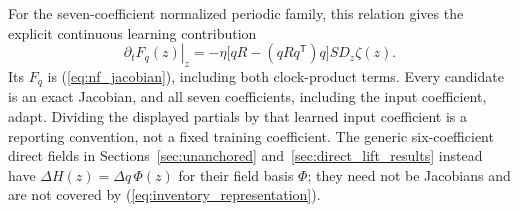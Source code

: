 \documentclass[journal]{IEEEtran}
\begin{document}
For the seven-coefficient normalized periodic family, this relation gives
the explicit continuous learning contribution
\begin{equation}
 \left.\partial_t F_q(z)\right|_z
 =-\eta\bigl[qR-(qRq^{\mathsf T})q\bigr]S D_z\zeta(z).
 \label{eq:inventory_normalized_partials}
\end{equation}
Its $F_q$ is (\ref{eq:nf_jacobian}), including both clock-product terms.
Every candidate is an exact Jacobian, and all seven coefficients, including
the input coefficient, adapt. Dividing the displayed partials by that
learned input coefficient is a reporting convention, not a fixed training
coefficient. The generic six-coefficient direct fields in
Sections~\ref{sec:unanchored} and~\ref{sec:direct_lift_results} instead have
$\Delta H(z)=\Delta q\,\Phi(z)$ for their field basis $\Phi$; they need not
be Jacobians and are not covered by (\ref{eq:inventory_representation}).
\end{document}
